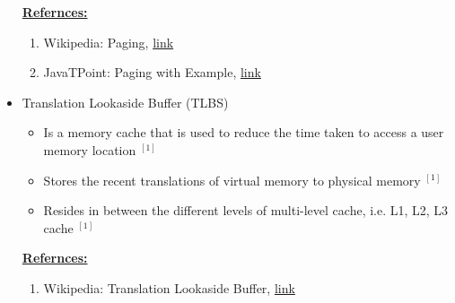 \documentclass[12pt]{article}
\begin{document}
\begin{itemize}
    \bigskip

    \underline{\textbf{Refernces:}}

    \bigskip

    \begin{enumerate}[1)]
        \item Wikipedia: Paging, \href{https://en.wikipedia.org/wiki/Paging}{link}
        \item JavaTPoint: Paging with Example, \href{https://www.javatpoint.com/os-paging-with-example}{link}
    \end{enumerate}
    \item Translation Lookaside Buffer (TLBS)
    \begin{itemize}
        \item Is a memory cache that is used to reduce the time taken to access
        a user memory location $^{[1]}$
        \item Stores the recent translations of virtual memory to physical memory $^{[1]}$
        \item Resides in between the different levels of multi-level cache, i.e. L1, L2, L3 cache $^{[1]}$
    \end{itemize}

    \bigskip

    \underline{\textbf{Refernces:}}

    \bigskip

    \begin{enumerate}[1)]
        \item Wikipedia: Translation Lookaside Buffer, \href{https://en.wikipedia.org/wiki/Translation_lookaside_buffer}{link}
    \end{enumerate}
\end{itemize}
\end{document}
